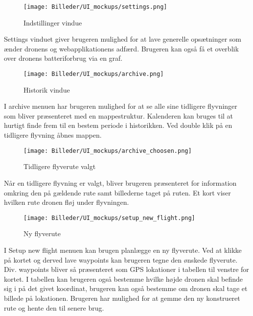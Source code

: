 \vspace{-5pt}
\begin{figure}[H]
	\centering
	\texttt{[image: Billeder/UI\_mockups/settings.png]}
	\vspace{-5pt}
	\caption{Indstillinger vindue}
	\label{fig:mockup_settings}
\end{figure}

Settings vinduet giver brugeren mulighed for at lave generelle opsætninger som ænder dronens og webapplikationens adfærd. Brugeren kan også få et overblik over dronens batteriforbrug via en graf.

\vspace{-5pt}
\begin{figure}[H]
	\centering
	\texttt{[image: Billeder/UI\_mockups/archive.png]}
	\vspace{-5pt}
	\caption{Historik vindue}
	\label{fig:mockup_archive}
\end{figure}

I archive menuen har brugeren mulighed for at se alle sine tidligere flyvninger som bliver præsenteret med en mappestruktur. Kalenderen kan bruges til at hurtigt finde frem til en bestem periode i historikken. Ved double klik på en tidligere flyvning åbnes mappen.

\vspace{-5pt}
\begin{figure}[H]
	\centering
	\texttt{[image: Billeder/UI\_mockups/archive\_choosen.png]}
	\vspace{-5pt}
	\caption{Tidligere flyverute valgt}
	\label{fig:mockup_archive_choosen}
\end{figure}

Når en tidligere flyvning er valgt, bliver brugeren præsenteret for information omkring den på gældende rute samt billederne taget på ruten. Et kort viser hvilken rute dronen fløj under flyvningen.

\vspace{-5pt}
\begin{figure}[H]
	\centering
	\texttt{[image: Billeder/UI\_mockups/setup\_new\_flight.png]}
	\vspace{-5pt}
	\caption{Ny flyverute}
	\label{fig:mockup_setup_new_flight}
\end{figure}

I Setup new flight menuen kan brugen planlægge en ny flyverute. Ved at klikke på kortet og derved lave waypoints kan brugeren tegne den ønskede flyverute. Div. waypoints bliver så præsenteret som GPS lokationer i tabellen til venstre for kortet. I tabellen kan brugeren også bestemme hvilke højde dronen skal befinde sig i på det givet koordinat, brugeren kan også bestemme om dronen skal tage et billede på lokationen. Brugeren har mulighed for at gemme den ny konstrueret rute og hente den til senere brug. 